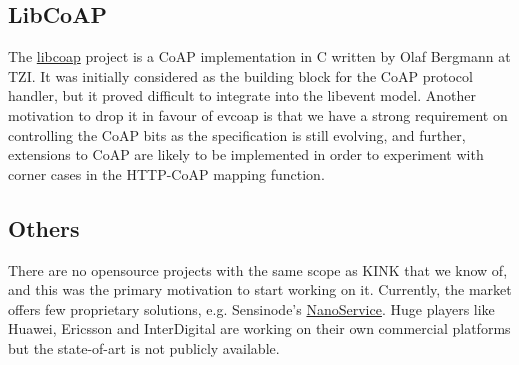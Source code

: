 \subsection{LibCoAP}
The \href{http://sourceforge.net/projects/libcoap}{libcoap} project is a CoAP implementation in C written by Olaf Bergmann at TZI.
It was initially considered as the building block for the CoAP protocol handler, but it proved difficult to integrate into the libevent model.  Another motivation to drop it in favour of evcoap is that we have a strong requirement on controlling the CoAP bits as the specification is still evolving, and further, extensions to CoAP are likely to be implemented in order to experiment with corner cases in the HTTP-CoAP mapping function.

\subsection{Others}
There are no opensource projects with the same scope as KINK that we know of, and this was the primary motivation to start working on it.
Currently, the market offers few proprietary solutions, e.g. Sensinode's \href{http://www.sensinode.com/EN/products/nanoservice.html}{NanoService}.  Huge players like Huawei, Ericsson and InterDigital are working on their own commercial platforms but the state-of-art is not publicly available.

